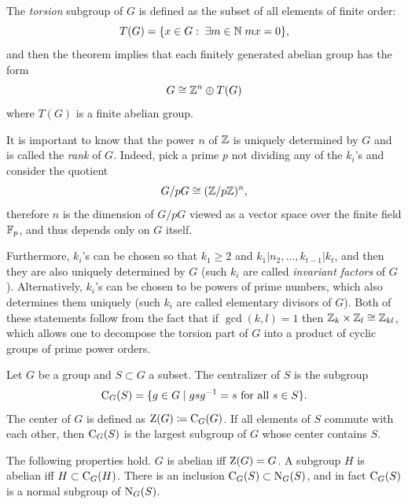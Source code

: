 \begin{rem}
    The \emph{torsion} subgroup of $G$ is defined as the subset of all elements of finite order:
    \[T(G)=\{x\in G:\;\exists m\in\mathbb{N}\; mx=0\},\]
    and then the theorem implies that each finitely generated abelian group has the form
    \[G\cong \mathbb{Z}^n\oplus T(G)\]
    where $T(G)$ is a finite abelian group.
    
    It is important to know that the power $n$ of $\mathbb{Z}$ is uniquely determined by $G$ and is called the \emph{rank} of $G$. Indeed, pick a prime $p$ not dividing any of the $k_i$'s and consider the quotient
    \[G\slash pG\cong (\mathbb{Z}\slash p\mathbb{Z})^n,\]
    therefore $n$ is the dimension of $G\slash pG$ viewed as a vector space over the finite field $\mathbb{F}_p$, and thus depends only on $G$ itself.

    Furthermore, $k_i$'s can be chosen so that $k_1\geq 2$ and $k_1|n_2,\ldots, k_{t-1}|k_t$, and then they are also uniquely determined by $G$ (such $k_i$ are called \emph{invariant factors} of $G$). Alternatively, $k_i$'s can be chosen to be powers of prime numbers, which also determines them uniquely (such $k_i$ are called elementary divisors of $G$). Both of these statements follow from the fact that if $\gcd(k,l)=1$ then $\mathbb{Z}_k\times \mathbb{Z}_l\cong \mathbb{Z}_{kl}$, which allows one to decompose the torsion part of $G$ into a product of cyclic groups of prime power orders.
\end{rem}


\begin{defn}[Centralizer]
    Let $G$ be a group and $S\subset G$ a subset. The centralizer of $S$ is the subgroup
    \[\mathrm{C}_G(S)=\{g\in G\mid gsg^{-1}=s \text{ for all }s\in S\}.\]
    The center of $G$ is defined as $\mathrm{Z}(G)\coloneqq \mathrm{C}_G(G)$. If all elements of $S$ commute with each other, then $\mathrm{C}_G(S)$ is the largest subgroup of $G$ whose center contains $S$.
    
    The following properties hold. $G$ is abelian iff $\mathrm{Z}(G)=G$. A subgroup $H$ is abelian iff $H\subset \mathrm{C}_G(H)$. There is an inclusion $\mathrm{C}_G(S)\subset \mathrm{N}_G(S)$, and in fact $\mathrm{C}_G(S)$ is a normal subgroup of $\mathrm{N}_G(S)$.
\end{defn}

